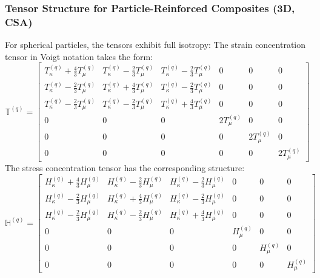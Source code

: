 \documentclass[oneside, 12pt, a4paper, bibliography=totoc]{book}
\begin{document}
\subsubsection{Tensor Structure for Particle-Reinforced Composites (3D, CSA)}
\label{subsec:tensor_structure_particle}

For spherical particles, the tensors exhibit full isotropy:
%
The strain concentration tensor in Voigt notation takes the form:
\begin{equation}
    \mathbb{T}^{(q)} =
    \begin{bmatrix}
        T_{\kappa}^{(q)} + \frac{4}{3}T_{\mu}^{(q)} & T_{\kappa}^{(q)} - \frac{2}{3}T_{\mu}^{(q)} & T_{\kappa}^{(q)} - \frac{2}{3}T_{\mu}^{(q)} & 0 & 0 & 0 \\[4pt]
        T_{\kappa}^{(q)} - \frac{2}{3}T_{\mu}^{(q)} & T_{\kappa}^{(q)} + \frac{4}{3}T_{\mu}^{(q)} & T_{\kappa}^{(q)} - \frac{2}{3}T_{\mu}^{(q)} & 0 & 0 & 0 \\[4pt]
        T_{\kappa}^{(q)} - \frac{2}{3}T_{\mu}^{(q)} & T_{\kappa}^{(q)} - \frac{2}{3}T_{\mu}^{(q)} & T_{\kappa}^{(q)} + \frac{4}{3}T_{\mu}^{(q)} & 0 & 0 & 0 \\[4pt]
        0 & 0 & 0 & 2T_{\mu}^{(q)} & 0 & 0 \\[4pt]
        0 & 0 & 0 & 0 & 2T_{\mu}^{(q)} & 0 \\[4pt]
        0 & 0 & 0 & 0 & 0 & 2T_{\mu}^{(q)}
    \end{bmatrix}
    \label{eq:T_particle_structure}
\end{equation}
The stress concentration tensor has the corresponding structure:
\begin{equation}
    \mathbb{H}^{(q)} =
    \begin{bmatrix}
        H_{\kappa}^{(q)} + \frac{4}{3}H_{\mu}^{(q)} & H_{\kappa}^{(q)} - \frac{2}{3}H_{\mu}^{(q)} & H_{\kappa}^{(q)} - \frac{2}{3}H_{\mu}^{(q)} & 0 & 0 & 0 \\[4pt]
        H_{\kappa}^{(q)} - \frac{2}{3}H_{\mu}^{(q)} & H_{\kappa}^{(q)} + \frac{4}{3}H_{\mu}^{(q)} & H_{\kappa}^{(q)} - \frac{2}{3}H_{\mu}^{(q)} & 0 & 0 & 0 \\[4pt]
        H_{\kappa}^{(q)} - \frac{2}{3}H_{\mu}^{(q)} & H_{\kappa}^{(q)} - \frac{2}{3}H_{\mu}^{(q)} & H_{\kappa}^{(q)} + \frac{4}{3}H_{\mu}^{(q)} & 0 & 0 & 0 \\[4pt]
        0 & 0 & 0 & H_{\mu}^{(q)} & 0 & 0 \\[4pt]
        0 & 0 & 0 & 0 & H_{\mu}^{(q)} & 0 \\[4pt]
        0 & 0 & 0 & 0 & 0 & H_{\mu}^{(q)}
    \end{bmatrix}
    \label{eq:H_particle_structure}
\end{equation}
\end{document}
